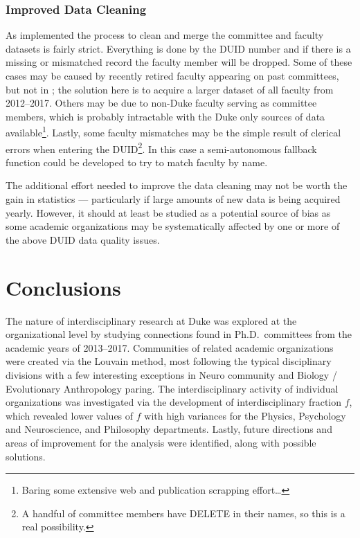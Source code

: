 \documentclass[notitlepage,aps,prd,nofootinbib]{revtex4-1}
\begin{document}
\subsubsection{Improved Data Cleaning}
As implemented the process to clean and merge the committee and faculty datasets is fairly strict. Everything is done by the DUID number and if there is a missing or mismatched record the faculty member will be dropped. Some of these cases may be caused by recently retired faculty appearing on past committees, but not in ; the solution here is to acquire a larger dataset of all faculty from 2012--2017. Others may be due to non-Duke faculty serving as committee members, which is probably intractable with the Duke only sources of data available\footnote{Baring some extensive web and publication scrapping effort\ldots}. Lastly, some faculty mismatches may be the simple result of clerical errors when entering the DUID\footnote{A handful of committee members have DELETE in their names, so this is a real possibility.}. In this case a semi-autonomous fallback function could be developed to try to match faculty by name.

The additional effort needed to improve the data cleaning may not be worth the gain in statistics --- particularly if large amounts of new data is being acquired yearly. However, it should at least be studied as a potential source of bias as some academic organizations may be systematically affected by one or more of the above DUID data quality issues.


\section{Conclusions}
The nature of interdisciplinary research at Duke was explored at the organizational level by studying connections found in Ph.D.\ committees from the academic years of 2013--2017. Communities of related academic organizations were created via the Louvain method, most following the typical disciplinary divisions with a few interesting exceptions in Neuro community and Biology / Evolutionary Anthropology paring. The interdisciplinary activity of individual organizations was investigated via the development of interdisciplinary fraction $f$, which revealed lower values of $f$ with high variances for the Physics, Psychology and Neuroscience, and Philosophy departments. Lastly, future directions and areas of improvement for the analysis were identified, along with possible solutions.
\end{document}
